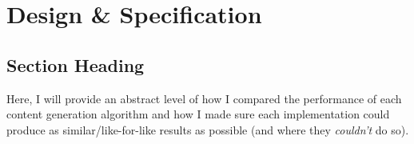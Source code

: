 \chapter{Design \& Specification}
  
% 
  
\section{Section Heading}

Here, I will provide an abstract level of how I compared the performance of each content generation algorithm and how I made sure each implementation could produce as similar/like-for-like results as possible (and where they \textit{couldn't} do so).